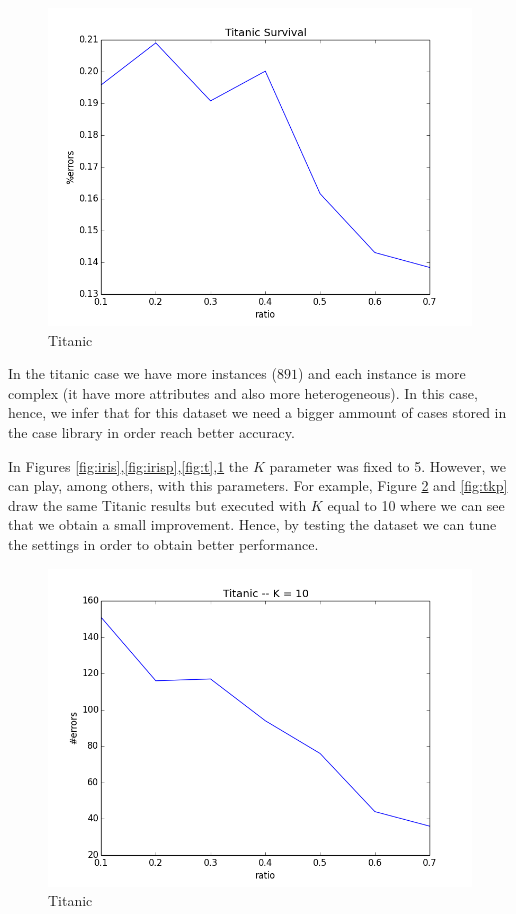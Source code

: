 \documentclass[11pt]{article}
\begin{document}
\begin{figure}[htb]
    \center
    \includegraphics[width=0.7\linewidth]{images/titanic_p_bo}
    \caption{Titanic}
    \label{fig:tp}
\end{figure}

In the titanic case we have more instances ($891$) and each instance is more complex (it have more attributes and also more heterogeneous). In this case, hence, we infer that for this dataset we need a bigger ammount of cases stored in the case library in order reach better accuracy.

In Figures \ref{fig:iris},\ref{fig:irisp},\ref{fig:t},\ref{fig:tp} the $K$ parameter was fixed to 5. However, we can play, among others, with this parameters. For example, Figure \ref{fig:tk} and \ref{fig:tkp} draw the same Titanic results but executed with $K$ equal to 10 where we can see that we obtain a small improvement. Hence, by testing the dataset we can tune the settings in order to obtain better performance.


\begin{figure}[htb]
    \center
    \includegraphics[width=0.7\linewidth]{images/tk10}
    \caption{Titanic}
    \label{fig:tk}
\end{figure}
\end{document}
